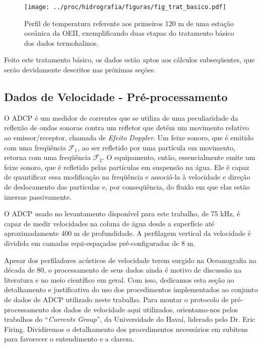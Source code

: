 \begin{figure}
 \begin{center}
  \texttt{[image: ../proc/hidrografia/figuras/fig\_trat\_basico.pdf]}
 \end{center}
 \vspace{-.25cm}
 \renewcommand{\baselinestretch}{1}
 \caption{\label{fig:trat_CTD} \small Perfil de temperatura referente aos primeiros 120 m de uma
estação oceânica da OEII, exemplificando duas etapas do tratamento básico dos dados termohalinos.}
\end{figure}

Feito este tratamento básico, os dados estão aptos aos cálculos subseq\"uentes, que serão
devidamente descritos nas próximas seções.   

\subsection{Dados de Velocidade - Pré-processamento}\label{sec:ADCP}

\hspace{6mm} O ADCP é um medidor de correntes que se utiliza de uma peculiaridade da reflexão
de ondas sonoras contra	 um refletor que detém um movimento relativo ao emissor/receptor,
chamada de {\it Efeito Doppler}. Um feixe sonoro, que é emitido com uma freq\"uência 
$\mathcal{F}_1$, ao ser refletido por uma partícula em movimento, retorna com uma
freq\"uência $\mathcal{F}_2$. O equipamento, então, essencialmente emite um feixe
sonoro, que é refletido pelas partículas em suspensão na água. Ele é capaz de quantificar
essa modificação na freq\"uência e associá-la à velocidade e direção de deslocamento
das partículas e, por conseq\"uência, do fluido em que elas estão imersas passivamente.

O ADCP usado no levantamento disponível para este trabalho, de 75 kHz, é capaz de medir velocidades 
na coluna de água desde a superfície até aproximadamente 400 m de profundidade. A perfilagem
vertical da velocidade é dividida em camadas equi-espaçadas pré-configuradas de 8 m. 

Apesar dos perfiladores acústicos de velocidade terem surgido na Oceanografia na década de 80, 
o processamento de seus dados ainda é motivo de discussão na literatura e no meio científico em geral.
Com isso, dedicamos esta seção ao detalhamento e justificativa do uso dos procedimentos implementados ao conjunto de dados de ADCP utilizado neste trabalho. Para montar o protocolo de pré-pro\-ces\-sa\-men\-to dos dados de velocidade aqui utilizados, orientamo-nos
pelos trabalhos do ``{\it Currents Group}'', da Universidade do Havaí, liderado pelo Dr. Eric Firing. Dividiremos o detalhamento dos 
procedimentos necessários em subitens para favorecer o entendimento e a clareza. 

